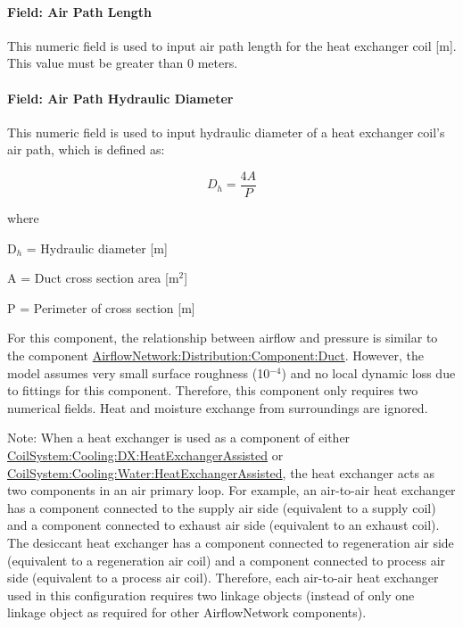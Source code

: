 \paragraph{Field: Air Path Length}\label{field-air-path-length-1}

This numeric field is used to input air path length for the heat exchanger coil {[}m{]}. This value must be greater than 0 meters.

\paragraph{Field: Air Path Hydraulic Diameter}\label{field-air-path-hydraulic-diameter-1}

This numeric field is used to input hydraulic diameter of a heat exchanger coil's air path, which is defined as:

\begin{equation}
{D_h} = \frac{{4A}}{P}
\end{equation}

where

D\(_{h}\) = Hydraulic diameter {[}m{]}

A = Duct cross section area {[}m\(^{2}\){]}

P = Perimeter of cross section {[}m{]}

For this component, the relationship between airflow and pressure is similar to the component \hyperref[airflownetworkdistributioncomponentduct]{AirflowNetwork:Distribution:Component:Duct}. However, the model assumes very small surface roughness (10\(^{-4}\)) and no local dynamic loss due to fittings for this component. Therefore, this component only requires two numerical fields. Heat and moisture exchange from surroundings are ignored.

Note: When a heat exchanger is used as a component of either \hyperref[coilsystemcoolingdxheatexchangerassisted]{CoilSystem:Cooling:DX:HeatExchangerAssisted} or \hyperref[coilsystemcoolingwaterheatexchangerassisted]{CoilSystem:Cooling:Water:HeatExchangerAssisted}, the heat exchanger acts as two components in an air primary loop. For example, an air-to-air heat exchanger has a component connected to the supply air side (equivalent to a supply coil) and a component connected to exhaust air side (equivalent to an exhaust coil). The desiccant heat exchanger has a component connected to regeneration air side (equivalent to a regeneration air coil) and a component connected to process air side (equivalent to a process air coil). Therefore, each air-to-air heat exchanger used in this configuration requires two linkage objects (instead of only one linkage object as required for other AirflowNetwork components).

